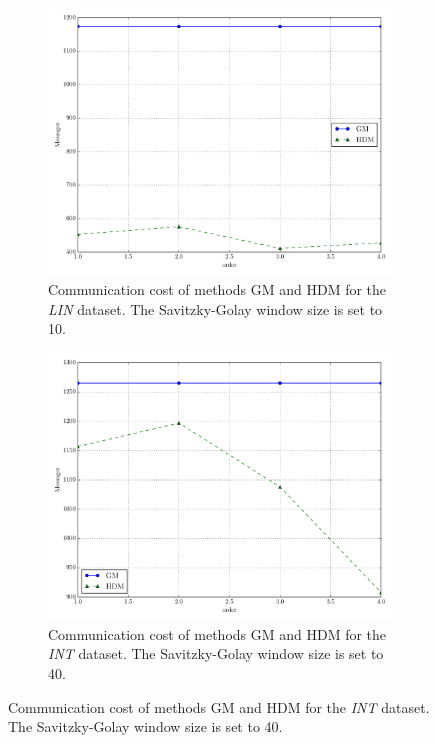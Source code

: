 \begin{figure}[!h]
\begin{subfigure}{0.32\textwidth}
  \includegraphics[width=\linewidth]{img/main_msg_linear_order.pdf}
  \caption{Communication cost of methods GM and HDM for the \emph{LIN} dataset. The Savitzky-Golay window size is set to 10.}
\end{subfigure}\hfill
\begin{subfigure}{0.32\textwidth}
  \includegraphics[width=\linewidth]{img/main_msg_interweaving_order.pdf}
  \caption{Communication cost of methods GM and HDM for the \emph{INT} dataset. The Savitzky-Golay window size is set to 40.}

\end{subfigure}
\end{figure}
